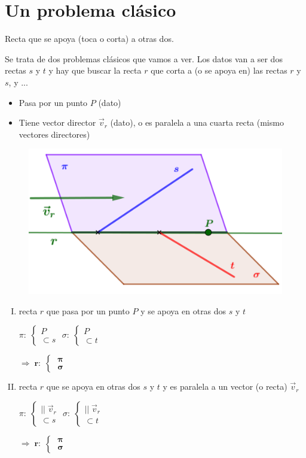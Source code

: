 	
\section{Un problema clásico}\label{apoya} 
\Large{Recta que se apoya (toca o corta) a otras dos.}

\normalsize{Se} trata de dos problemas clásicos que vamos a ver. Los datos van a ser dos rectas $s$ y $t$ y hay que buscar la recta $r$ que corta a (o se apoya en) las rectas $r$ y $s$, y ...
\begin{multicols}{2}
\begin{itemize}
\item	Pasa por un punto $P$ (dato)
\item Tiene vector director $\vec v_r$ (dato), o es paralela a una cuarta recta (mismo vectores directores)
\end{itemize}
\begin{figure}[H]
	\centering
	\includegraphics[width=.4\textwidth]{imagenes/imagenes10/T10IM18.png}
\end{figure}
\end{multicols}

\begin{multicols}{2}
\begin{enumerate}[I. ]
\item recta $r$ que pasa por un punto $P$ y se apoya en otras dos $s$ y $t$	

$\pi:\; \begin{cases} P\\\subset s \end{cases}$
$\sigma:\; \begin{cases} P\\\subset t \end{cases}$

$ \Rightarrow \; \boldsymbol{r:\; \begin{cases}\; \pi \\ \; \sigma \end{cases}}$
\item  recta $r$ que se apoya en otras dos $s$ y $t$ y es paralela a un vector (o recta) $\vec v_r$

$\pi:\; \begin{cases} ||\;\vec v_r \\ \subset s \end{cases}$
$\sigma:\; \begin{cases} ||\;\vec v_r \\ \subset t \end{cases}$

$ \Rightarrow \; \boldsymbol{r:\; \begin{cases}\; \pi \\ \; \sigma \end{cases}}$
\end{enumerate}
\end{multicols}


